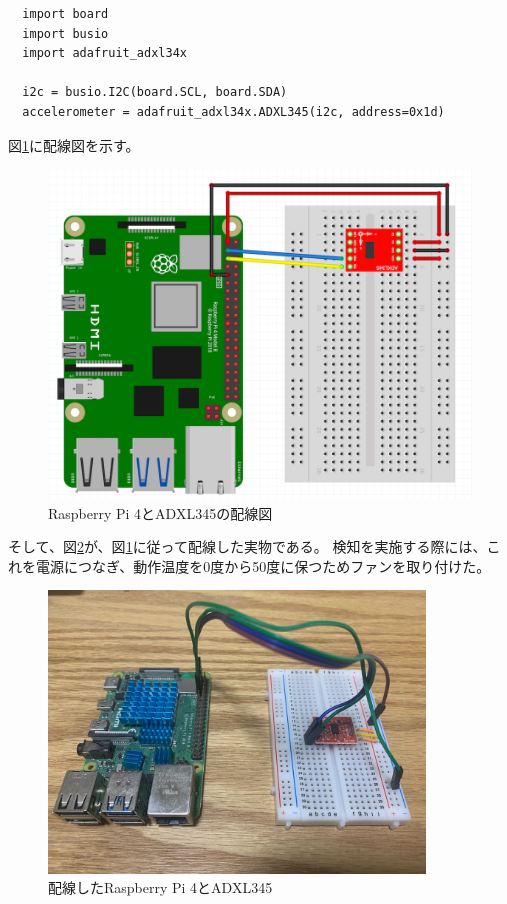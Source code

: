 \begin{verbatim}
  import board
  import busio
  import adafruit_adxl34x

  i2c = busio.I2C(board.SCL, board.SDA)
  accelerometer = adafruit_adxl34x.ADXL345(i2c, address=0x1d)
\end{verbatim}

図\ref{fig:meal_detector_wire_illustration}に配線図を示す。

\begin{figure}[htbp]
  \caption{Raspberry Pi 4とADXL345の配線図}
  \label{fig:meal_detector_wire_illustration}
  \begin{center}
    \includegraphics[bb=0 0 1000 800,width=15cm]{assets/raspi_adxl345.png}
  \end{center}
\end{figure}

そして、図\ref{fig:meal_detector}が、図\ref{fig:meal_detector_wire_illustration}に従って配線した実物である。
検知を実施する際には、これを電源につなぎ、動作温度を0度から50度に保つためファンを取り付けた。\cite{raspi_4_heat} \cite{raspi_4_spec}

\begin{figure}[htbp]
  \caption{配線したRaspberry Pi 4とADXL345}
  \label{fig:meal_detector}
  \begin{center}
    \includegraphics[bb=0 0 1300 1100,width=10cm]{assets/meal_detector.jpg}
  \end{center}
\end{figure}

